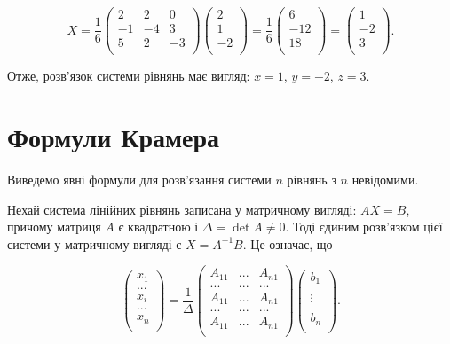 $$X = \dfrac{1}{6} \begin{pmatrix}
	2  & 2  & 0  \\
	-1 & -4 & 3  \\
	5  & 2  & -3 \\
\end{pmatrix} \begin{pmatrix}
	 2 \\
	 1 \\
	-2 \\
\end{pmatrix} 
= \dfrac{1}{6} \begin{pmatrix}
	 6  \\
	-12 \\
	 18  \\
\end{pmatrix}
= \begin{pmatrix}
	 1  \\
	-2 \\
	 3  \\
\end{pmatrix}.$$

Отже, розв’язок системи рівнянь має вигляд: $x = 1$, $y = -2$, $z = 3$.

\section{Формули Крамера}

Виведемо явні формули для розв’язання системи $n$ рівнянь з $n$ невідомими.

Нехай система лінійних рівнянь записана у матричному вигляді: $A X = B$,
причому матриця $A$ є квадратною і $\Delta = \det A \neq 0$. Тоді єдиним розв’язком цієї
системи у матричному вигляді є $X = A^{-1} B$. Це означає, що

$$\begin{pmatrix}
	x_1 \\
	... \\
	x_i \\
	... \\
	x_n \\
\end{pmatrix}
= \dfrac{1}{\Delta} \begin{pmatrix}
	A_{11} & ... & A_{n1} \\
	...    & ... & ...    \\
	A_{11} & ... & A_{n1} \\
	...    & ... & ...    \\
	A_{11} & ... & A_{n1} \\
\end{pmatrix} \begin{pmatrix}
	b_1    \\
	~      \\
	\vdots \\
	~      \\
	b_n    \\
\end{pmatrix}.$$



